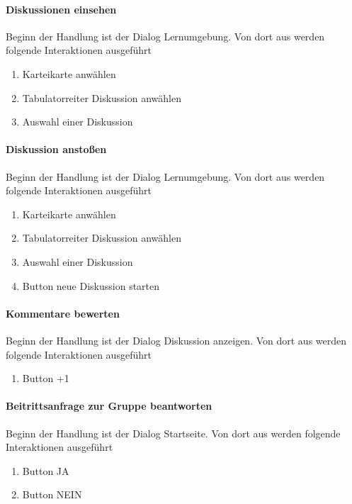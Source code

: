 \documentclass[12pt,a4paper]{article}
\begin{document}
{\paragraph{Diskussionen einsehen}
Beginn der Handlung ist der Dialog \glqq Lernumgebung\grqq. Von dort aus werden folgende Interaktionen ausgeführt
\begin{enumerate}
\item \glqq Karteikarte anwählen\grqq
\item \glqq Tabulatorreiter Diskussion anwählen\grqq
\item \glqq Auswahl einer Diskussion\grqq
\end{enumerate}

\paragraph{Diskussion anstoßen}
Beginn der Handlung ist der Dialog \glqq Lernumgebung\grqq. Von dort aus werden folgende Interaktionen ausgeführt
\begin{enumerate}
\item \glqq Karteikarte anwählen\grqq
\item \glqq Tabulatorreiter Diskussion anwählen\grqq
\item \glqq Auswahl einer Diskussion\grqq
\item \glqq Button neue Diskussion starten\grqq
\end{enumerate}

\paragraph{Kommentare bewerten}
Beginn der Handlung ist der Dialog \glqq Diskussion anzeigen\grqq. Von dort aus werden folgende Interaktionen ausgeführt
\begin{enumerate}
\item \glqq Button +1\grqq
\end{enumerate}

\paragraph{Beitrittsanfrage zur Gruppe beantworten}
Beginn der Handlung ist der Dialog \glqq Startseite\grqq. Von dort aus werden folgende Interaktionen ausgeführt
\begin{enumerate}
\item \glqq Button JA\grqq
\item \glqq Button NEIN\grqq
\end{enumerate}


}
\end{document}
